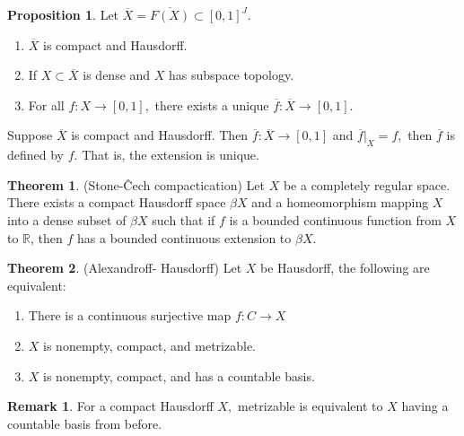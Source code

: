 \documentclass[10pt, oneside]{article}
\theoremstyle{definition}
\newtheorem{thm}{Theorem}
\newtheorem{prop}{Proposition}
\newtheorem{rem}{Remark}
\begin{document}
\begin{prop}
    Let $\overline{X} = \overline{F(X)}\subset [0,1]^J.$
    \begin{enumerate}
        \item $\overline{X}$ is compact and Hausdorff.
        \item If $X\subset \overline{X}$ is dense and $X$ has subspace topology.
        \item For all $f: X\to [0,1],$ there exists a unique $\overline{f}: \overline{X}\to [0,1].$
    \end{enumerate}
\end{prop}
\begin{lemma}
    Suppose $\overline{X}$ is compact and Hausdorff. Then $\overline{f}: \overline{X}\to [0,1]$ and $\overline{f}|_X = f,$ then $\overline{f}$ is defined by $f.$ That is, the extension is unique.
\end{lemma}

\begin{thm} (Stone-\^{C}ech compactication)
    Let \( X \) be a completely regular space. There exists a compact Hausdorff space \( \beta X \) and a homeomorphism mapping \( X \) into a dense subset of \( \beta X \) such that if \( f \) is a bounded continuous function from \( X \) to \( \mathbb{R} \), then \( f \) has a bounded continuous extension to \( \beta X \).
\end{thm}

\begin{thm}
    (Alexandroff- Hausdorff) Let $X$ be Hausdorff, the following are equivalent:
    \begin{enumerate}
        \item There is a continuous surjective map $f: C\to X$
        \item $X$ is nonempty, compact, and metrizable.
        \item $X$ is nonempty, compact, and has a countable basis.
    \end{enumerate}
\end{thm}
\begin{rem}
    For a compact Hausdorff $X,$ metrizable is equivalent to $X$ having a countable basis from before.
\end{rem}
\end{document}
